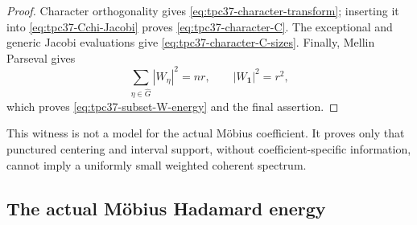 \begin{proof}
Character orthogonality gives
\eqref{eq:tpc37-character-transform}; inserting it
into \eqref{eq:tpc37-Cchi-Jacobi} proves
\eqref{eq:tpc37-character-C}.  The exceptional and generic Jacobi
evaluations give \eqref{eq:tpc37-character-C-sizes}.  Finally, Mellin
Parseval gives
\[
 \sum_{\eta\in\widehat G}|W_\eta|^2=nr,
 \qquad |W_{\mathbf1}|^2=r^2,
\]
which proves \eqref{eq:tpc37-subset-W-energy} and the final assertion.
\end{proof}

This witness is not a model for the actual M\"obius coefficient.  It
proves only that punctured centering and interval support, without
coefficient-specific information, cannot imply a uniformly small
weighted coherent spectrum.

\subsection{The actual M\"obius Hadamard energy}

